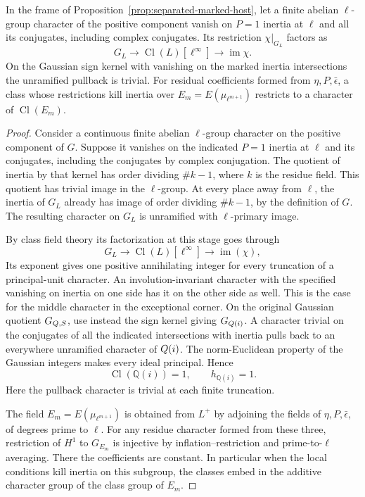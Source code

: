\begin{lemma}
\label{lem:fitted-abelian-quotient}
In the frame of Proposition~\ref{prop:separated-marked-host}, let a
finite abelian \(\ell\)-group character of the positive component
vanish on \(P=1\) inertia at \(\ell\) and all its conjugates, including
complex conjugates. Its restriction \(\chi|_{G_L}\) factors as 
\[
 G_L\longrightarrow\operatorname{Cl}(L)[\ell^\infty]\longrightarrow\operatorname{im}\chi.
\]
 On the Gaussian sign kernel
with vanishing on the marked inertia intersections the unramified
pullback is trivial. For residual coefficients formed from
\(\eta,P,\bar\epsilon\), a class whose restrictions kill inertia
over \(E_m=E(\mu_{\ell^{m+1}})\) restricts to a character of
\(\operatorname{Cl}(E_m)\).
\end{lemma}

\begin{proof}
Consider a continuous finite abelian \(\ell\)-group character on
the positive component of \(G\). Suppose it vanishes on the
indicated \(P=1\) inertia at \(\ell\) and its conjugates,
including the conjugates by complex conjugation. The quotient
of inertia by that kernel has order dividing \(\#k-1\), where
\(k\) is the residue field. This quotient has trivial image
in the \(\ell\)-group. At every place away from \(\ell\),
the inertia of \(G_L\) already has image of order dividing
\(\#k-1\), by the definition of \(G\). The resulting character on \(G_L\) is unramified with \(\ell\)-primary image.

By class field theory its factorization at this stage goes through
\[
 G_L\longrightarrow\operatorname{Cl}(L)[\ell^\infty]\longrightarrow\operatorname{im}(\chi),
\] Its exponent gives one
positive annihilating integer for every truncation of a
principal-unit character. An involution-invariant character
with the specified vanishing on inertia on one side has
it on the other side as well. This is the case for the
middle character in the exceptional corner. On the original
Gaussian quotient \(G_{Q,S}\), use instead the sign kernel
giving \(G_{Q(i)}\). A character trivial on the conjugates
of all the indicated intersections with inertia pulls back
to an everywhere unramified character of \(Q(i)\). The norm-Euclidean property of the Gaussian integers makes every ideal principal. Hence
\[
 \operatorname{Cl}(\mathbb Q(i))=1,\qquad h_{\mathbb Q(i)}=1 .
\]
Here the pullback character is trivial at each finite
truncation. \cite{ray-class}\label{cor:ordinary-fitted-arithmetic-1}

The field \(E_m=E(\mu_{\ell^{m+1}})\) is
obtained from \(L^+\) by adjoining the fields of
\(\eta,P,\bar\epsilon\), of degrees prime to \(\ell\).
For any residue character formed from these three, restriction
of \(H^1\) to \(G_{E_m}\) is injective by
inflation--restriction and prime-to-\(\ell\) averaging.
There the coefficients are constant. In particular when the
local conditions kill inertia on this subgroup, the classes
embed in the additive character group of the class group of
\(E_m\). 
\end{proof}

